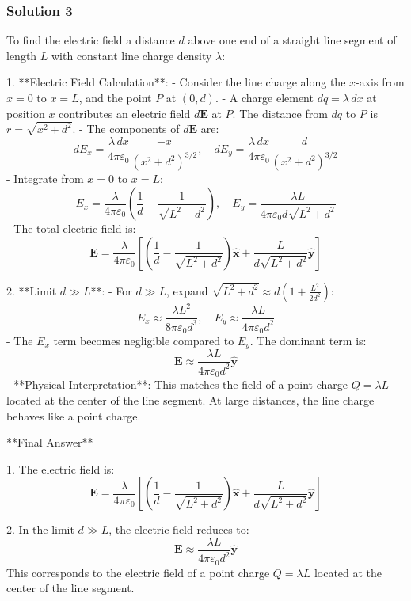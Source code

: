 \documentclass{article}
\begin{document}
\subsubsection{Solution 3}
To find the electric field a distance \( d \) above one end of a straight line segment of length \( L \) with constant line charge density \( \lambda \):

1. **Electric Field Calculation**:
   - Consider the line charge along the \( x \)-axis from \( x = 0 \) to \( x = L \), and the point \( P \) at \( (0, d) \).
   - A charge element \( dq = \lambda \, dx \) at position \( x \) contributes an electric field \( d\mathbf{E} \) at \( P \). The distance from \( dq \) to \( P \) is \( r = \sqrt{x^2 + d^2} \).
   - The components of \( d\mathbf{E} \) are:
     \[
     dE_x = \frac{\lambda \, dx}{4\pi \varepsilon_0} \frac{-x}{(x^2 + d^2)^{3/2}}, \quad
     dE_y = \frac{\lambda \, dx}{4\pi \varepsilon_0} \frac{d}{(x^2 + d^2)^{3/2}}
     \]
   - Integrate from \( x = 0 \) to \( x = L \):
     \[
     E_x = \frac{\lambda}{4\pi \varepsilon_0} \left( \frac{1}{d} - \frac{1}{\sqrt{L^2 + d^2}} \right), \quad
     E_y = \frac{\lambda L}{4\pi \varepsilon_0 d \sqrt{L^2 + d^2}}
     \]
   - The total electric field is:
     \[
     \mathbf{E} = \frac{\lambda}{4\pi \varepsilon_0} \left[ \left( \frac{1}{d} - \frac{1}{\sqrt{L^2 + d^2}} \right) \hat{\mathbf{x}} + \frac{L}{d \sqrt{L^2 + d^2}} \hat{\mathbf{y}} \right]
     \]

2. **Limit \( d \gg L \)**:
   - For \( d \gg L \), expand \( \sqrt{L^2 + d^2} \approx d \left( 1 + \frac{L^2}{2d^2} \right) \):
     \[
     E_x \approx \frac{\lambda L^2}{8\pi \varepsilon_0 d^3}, \quad E_y \approx \frac{\lambda L}{4\pi \varepsilon_0 d^2}
     \]
   - The \( E_x \) term becomes negligible compared to \( E_y \). The dominant term is:
     \[
     \mathbf{E} \approx \frac{\lambda L}{4\pi \varepsilon_0 d^2} \hat{\mathbf{y}}
     \]
   - **Physical Interpretation**: This matches the field of a point charge \( Q = \lambda L \) located at the center of the line segment. At large distances, the line charge behaves like a point charge.

**Final Answer**

1. The electric field is:
   \[
   \boxed{\mathbf{E} = \frac{\lambda}{4\pi \varepsilon_0} \left[ \left( \frac{1}{d} - \frac{1}{\sqrt{L^2 + d^2}} \right) \hat{\mathbf{x}} + \frac{L}{d \sqrt{L^2 + d^2}} \hat{\mathbf{y}} \right]}
   \]

2. In the limit \( d \gg L \), the electric field reduces to:
   \[
   \boxed{\mathbf{E} \approx \frac{\lambda L}{4\pi \varepsilon_0 d^2} \hat{\mathbf{y}}}
   \]
   This corresponds to the electric field of a point charge \( Q = \lambda L \) located at the center of the line segment.
\end{document}
